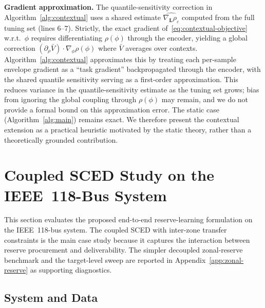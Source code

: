 \documentclass[11pt]{article}
\newcommand{\bL}{\bm{L}}
\theoremstyle{definition}
\begin{document}
\textbf{Gradient approximation.} The quantile-sensitivity correction in Algorithm~\ref{alg:contextual} uses a shared estimate $\widehat{\nabla_{\bL}\rho_\varepsilon}$ computed from the full tuning set (lines 6--7). Strictly, the exact gradient of~\eqref{eq:contextual-objective} w.r.t.\ $\phi$ requires differentiating $\rho(\phi)$ through the encoder, yielding a global correction $(\partial_\rho \bar{V}) \cdot \nabla_\phi \rho(\phi)$ where $\bar{V}$ averages over contexts. Algorithm~\ref{alg:contextual} approximates this by treating each per-sample envelope gradient as a ``task gradient'' backpropagated through the encoder, with the shared quantile sensitivity serving as a first-order approximation. This reduces variance in the quantile-sensitivity estimate as the tuning set grows; bias from ignoring the global coupling through $\rho(\phi)$ may remain, and we do not provide a formal bound on this approximation error. The static case (Algorithm~\ref{alg:main}) remains exact. We therefore present the contextual extension as a practical heuristic motivated by the static theory, rather than a theoretically grounded contribution.

\section{Coupled SCED Study on the IEEE~118-Bus System}
\label{sec:application}

This section evaluates the proposed end-to-end reserve-learning formulation on the IEEE~118-bus system. The coupled SCED with inter-zone transfer constraints is the main case study because it captures the interaction between reserve procurement and deliverability. The simpler decoupled zonal-reserve benchmark and the target-level sweep are reported in Appendix~\ref{app:zonal-reserve} as supporting diagnostics.

\subsection{System and Data}
\end{document}
